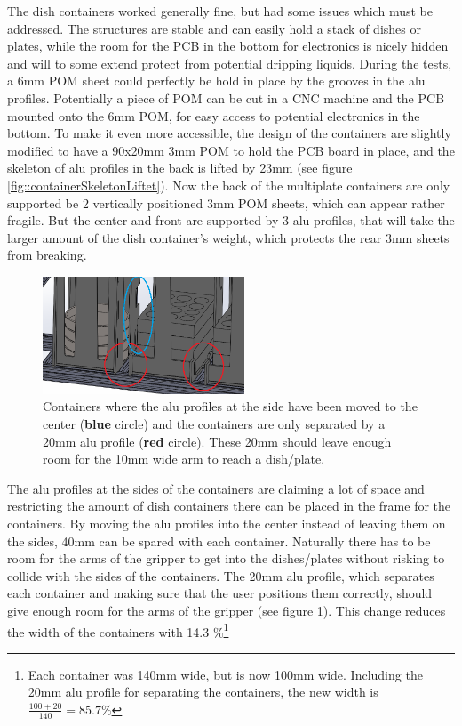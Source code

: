 \documentclass[10pt,a4paper]{article}
\begin{document}
		
		The dish containers worked generally fine, but had some issues which must be addressed. The structures are stable and can easily hold a stack of dishes or plates, while the room for the PCB in the bottom for electronics is nicely hidden and will to some extend protect from potential dripping liquids. During the tests, a 6mm POM sheet could perfectly be hold in place by the grooves in the alu profiles. Potentially a piece of POM can be cut in a CNC machine and the PCB mounted onto the 6mm POM, for easy access to potential electronics in the bottom. To make it even more accessible, the design of the containers are slightly modified to have a 90x20mm 3mm POM to hold the PCB board in place, and the skeleton of alu profiles in the back is lifted by 23mm (see figure \ref{fig::containerSkeletonLiftet}). Now the back of the multiplate containers are only supported be 2 vertically positioned 3mm POM sheets, which can appear rather fragile. But the center and front are supported by 3 alu profiles, that will take the larger amount of the dish container's weight, which protects the rear 3mm sheets from breaking.
		
				
		
		\begin{figure}
			\includegraphics[width=6cm]{images/newContainerDesign.png}
			\caption{Containers where the alu profiles at the side have been moved to the center ({\color{blue}\textbf{blue}} circle) and the containers are only separated by a 20mm alu profile ({\color{red}\textbf{red}} circle). These 20mm should leave enough room for the 10mm wide arm to reach a dish/plate.}
			\label{fig::newContainerDesign}
		\end{figure}
		
				
		The alu profiles at the sides of the containers are claiming a lot of space and restricting the amount of dish containers there can be placed in the frame for the containers. By moving the alu profiles into the center instead of leaving them on the sides, 40mm can be spared with each container. Naturally there has to be room for the arms of the gripper to get into the dishes/plates without risking to collide with the sides of the containers. The 20mm alu profile, which separates each container and making sure that the user positions them correctly, should give enough room for the arms of the gripper (see figure \ref{fig::newContainerDesign}). This change reduces the width of the containers with 14.3 \%\footnote{Each container was 140mm wide, but is now 100mm wide. Including the 20mm alu profile for separating the containers, the new width is $\frac{100 + 20}{140} = 85.7 \%$ }
		
\end{document}
